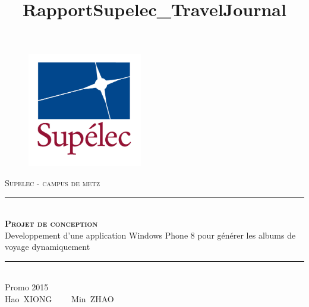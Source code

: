 \documentclass{article}
\title{RapportSupelec_TravelJournal}
\begin{document}

\newcommand\highlight[1]{\colorbox{yellow}{#1}} 
\renewcommand\thesection{\arabic{section}}
\begin{titlepage}
\newcommand{\HRule}{\rule{\linewidth}{1mm}} %
\newcommand{\VRule}{\rule{\lineheight}{0.2mm}} %
\center %

\begin{figure}[h ]
\centering
\includegraphics[width=50mm]{Logo_Supelec_RVB.jpg}
\end{figure}
\textsc{\LARGE Supelec - campus de metz}\\[0.5cm] %
\vspace{1.2cm}
\HRule \\[0.5cm]
{\textsc{\Huge \bfseries Projet de conception}\\[1cm]{\huge Developpement d'une application Windows Phone 8 pour générer les albums de voyage dynamiquement  \bfseries }}\\[0.4cm] 
\HRule \\[1.5cm]
\vspace{2.5cm}
\Large {
Promo 2015\\ 
\vspace{1cm}
Hao\ \textsc{XIONG} \ \ \ \
Min\ \textsc{ZHAO}
}
\vfill %
\end{titlepage}
\tableofcontents 
\newpage
\listoffigures 
\newpage
\lstlistoflistings
\newpage
\end{document}
